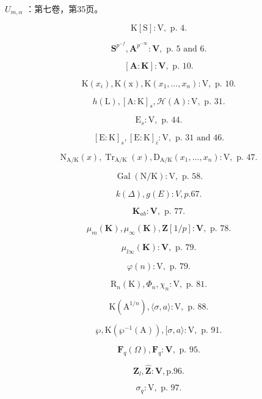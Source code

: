 \(U_{m,\alpha}\) ：第七卷，第35页。

\[
\mathrm{K} [ \mathrm{S} ]: \mathrm{V}, \text { p. } 4.
\]

\[
\mathbf {S} ^ {p ^ {- f}}, \mathbf {A} ^ {p ^ {- \infty}}: \mathbf {V}, \text { p. } 5 \text { and } 6.
\]

\[
[ \mathbf {A}: \mathbf {K} ]: \mathbf {V}, \text { p. } 10.
\]

\[
\mathrm{K} (x _ {i}), \mathrm{K} (\mathrm{x}), \mathrm{K} (x _ {1}, \dots , x _ {n}): \mathrm{V}, \text { p. } 10.
\]

\[
h (\mathrm{L}), [ \mathrm{A}: \mathrm{K} ] _ {s}, \mathscr {H} (\mathrm{A}): \mathrm{V}, \text { p. } 31.
\]

\[
\mathrm{E} _ {s}: \mathrm{V}, \text { p. } 44.
\]

\[
[ \mathrm{E}: \mathrm{K} ] _ {s}, [ \mathrm{E}: \mathrm{K} ] _ {i}: \mathrm{V}, \text { p. } 31 \text { and } 46.
\]

\[
\mathrm{N} _ {\mathrm{A} / \mathrm{K}} (x), \operatorname{Tr} _ {\mathrm{A} / \mathrm{K}} (x), \mathrm{D} _ {\mathrm{A} / \mathrm{K}} (x _ {1}, \dots , x _ {n}): \mathrm{V}, \text { p. } 47.
\]

\[
\operatorname{Gal} (\mathrm{N} / \mathrm{K}): \mathrm{V}, \text { p. } 58.
\]

\[
k (\Delta), g (E): V, p. 67.
\]

\[
\mathbf {K} _ {ab}: \mathbf {V}, \text { p. } 77.
\]

\[
\mu_ {m} (\mathbf {K}), \mu_ {\infty} (\mathbf {K}), \mathbf {Z} [ 1 / p ]: \mathbf {V}, \text {   p.   } 78.
\]

\[
\mu_ {l\infty} (\mathbf {K}): \mathbf {V}, \text { p. } 79.
\]

\[
\varphi (n): \mathrm{V}, \text { p. } 79.
\]

\[
\mathrm{R} _ {n} (\mathrm{K}), \Phi_ {n}, \chi_ {n}: \mathrm{V}, \text { p. } 81.
\]

\[
\mathrm{K} \left(\mathrm{A} ^ {1 / n}\right), \langle \sigma , a \rangle : \mathrm{V}, \text { p. } 88.
\]

\[
\wp , \mathrm{K} (\wp^ {- 1} (\mathrm{A})), [ \sigma , a \rangle : \mathrm{V}, \text { p. } 91.
\]

\[
\mathbf {F} _ {q} (\Omega), \mathbf {F} _ {q}: \mathbf {V}, \text { p. } 95.
\]

\[
\mathbf {Z} _ {l}, \hat {\mathbf {Z}}: \mathbf {V}, \mathrm{p.} 96.
\]

\[
\sigma_ {q}: \mathrm{V}, \text { p. } 97.
\]


